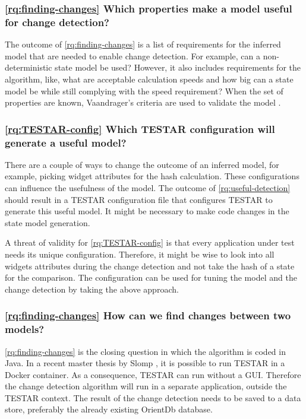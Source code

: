 \subsubsection{\ref{rq:finding-changes} Which properties make a model useful for change detection?}
The outcome of \ref{rq:finding-changes} is a list of requirements for the inferred model that are needed to enable change detection. For example, can a non-deterministic state model be used? However, it also includes requirements for the algorithm, like, what are acceptable calculation speeds and how big can a state model be while still complying with the speed requirement? When the set of properties are known, Vaandrager's criteria are used to validate the model \cite{vaandrager}.

\subsubsection{\ref{rq:TESTAR-config} Which TESTAR configuration will generate a useful model?}
There are a couple of ways to change the outcome of an inferred model, for example, picking widget attributes for the hash calculation. These configurations can influence the usefulness of the model. The outcome of \ref{rq:useful-detection} should result in a TESTAR configuration file that configures TESTAR to generate this useful model. It might be necessary to make code changes in the state model generation.

A threat of validity for \ref{rq:TESTAR-config} is that every application under test needs its unique configuration. Therefore, it might be wise to look into all widgets attributes during the change detection and not take the hash of a state for the comparison. The configuration can be used for tuning the model and the change detection by taking the above approach.

\subsubsection{\ref{rq:finding-changes} How can we find changes between two models?}
\ref{rq:finding-changes} is the closing question in which the algorithm is coded in Java. In a recent master thesis by Slomp \cite{thesisSlomp}, it is possible to run TESTAR in a Docker container. As a consequence, TESTAR can run without a GUI. Therefore the change detection algorithm will run in a separate application, outside the TESTAR context. The result of the change detection needs to be saved to a data store, preferably the already existing OrientDb database. 

